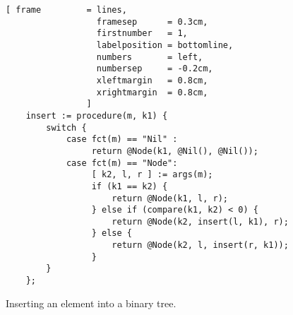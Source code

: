 \begin{figure}[!ht]
\centering
\begin{Verbatim}[ frame         = lines, 
                  framesep      = 0.3cm, 
                  firstnumber   = 1,
                  labelposition = bottomline,
                  numbers       = left,
                  numbersep     = -0.2cm,
                  xleftmargin   = 0.8cm,
                  xrightmargin  = 0.8cm,
                ]
    insert := procedure(m, k1) {
        switch {
            case fct(m) == "Nil" : 
                 return @Node(k1, @Nil(), @Nil());
            case fct(m) == "Node": 
                 [ k2, l, r ] := args(m);
                 if (k1 == k2) {
                     return @Node(k1, l, r);
                 } else if (compare(k1, k2) < 0) { 
                     return @Node(k2, insert(l, k1), r);
                 } else {
                     return @Node(k2, l, insert(r, k1));
                 }
        }
    };
\end{Verbatim}
\vspace*{-0.3cm}
\caption{Inserting an element into a binary tree.}
\label{fig:binary-tree-no-matching.stlx}
\end{figure}

